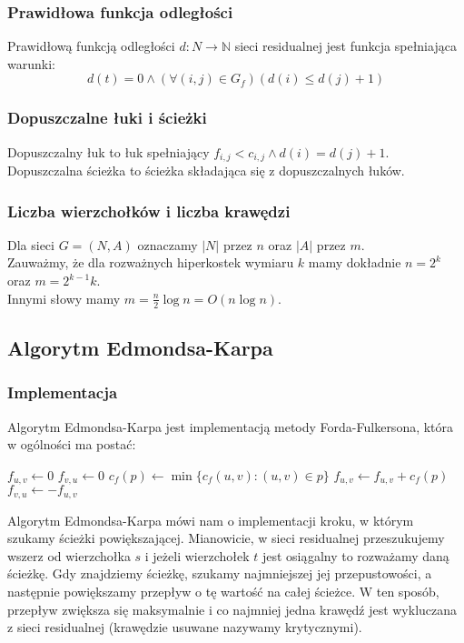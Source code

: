 \documentclass{article}
\begin{document}
\subsubsection{Prawidłowa funkcja odległości}
Prawidłową funkcją odległości $d:N\to \mathbb{N}$ sieci residualnej jest funkcja spełniająca warunki:
$$d(t)=0 \wedge (\forall (i,j)\in G_f)(d(i)\leq d(j)+1)$$ 

\subsubsection{Dopuszczalne łuki i ścieżki}
Dopuszczalny łuk to łuk spełniający $f_{i,j}<c_{i,j} \wedge d(i)=d(j)+1$.\\
Dopuszczalna ścieżka to ścieżka składająca się z dopuszczalnych łuków.  
\subsubsection{Liczba wierzchołków i liczba krawędzi}
Dla sieci $G=(N,A)$ oznaczamy $|N|$ przez $n$ oraz $|A|$ przez $m$. \\
Zauważmy, że dla rozważnych hiperkostek wymiaru $k$ mamy dokładnie $n=2^k$ oraz $m=2^{k-1}k$.\\
 Innymi słowy mamy $m=\frac{n}{2}\log n=O(n\log n)$.

\newpage

\subsection{Algorytm Edmondsa-Karpa}
\subsubsection{Implementacja}
Algorytm Edmondsa-Karpa jest implementacją metody Forda-Fulkersona, która w ogólności ma postać:
\begin{algorithmic}
		\State $f_{u,v}\gets 0$
		\State $f_{v,u}\gets 0$
	\EndFor
		\State $c_f(p)\gets \min\{c_f(u,v):(u,v)\in p\}$
			\State $f_{u,v}\gets f_{u,v}+c_f(p)$
			\State $f_{v,u}\gets -f_{u,v}$
		\EndFor
	\EndWhile
\EndFunction
\end{algorithmic}

Algorytm Edmondsa-Karpa mówi nam o implementacji kroku, w którym szukamy ścieżki powiększającej. Mianowicie, w sieci residualnej przeszukujemy wszerz od wierzchołka $s$ i jeżeli wierzchołek $t$ jest osiągalny to rozważamy daną ścieżkę. Gdy znajdziemy ścieżkę, szukamy najmniejszej jej przepustowości, a następnie powiększamy przepływ o tę wartość na całej ścieżce. W ten sposób, przepływ zwiększa się maksymalnie i co najmniej jedna krawędź jest wykluczana z sieci residualnej (krawędzie usuwane nazywamy krytycznymi). 
\end{document}
